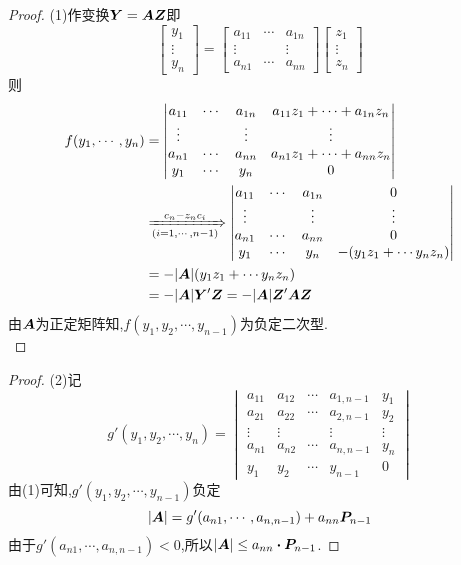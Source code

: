 \documentclass[lang=cn,11pt,normal]{elegantbook}
\begin{document}
		\begin{proof}
		(1)作变换$\YY=\AA\ZZ$即
		\begin{equation}
		\begin{bmatrix}
		y_1\\\vdots\\y_n
		\end{bmatrix}
		=
		\begin{bmatrix}
		a_{11}&\cdots&a_{1n}\\
		\vdots&      &\vdots\\
		a_{n1}&\cdots&a_{nn}
		\end{bmatrix}
		\begin{bmatrix}
		z_1\\\vdots\\z_n
		\end{bmatrix}
		\end{equation}
		则
		\begin{equation}
		\begin{aligned}
		f(y_1,\cdots,y_n)&=
		\begin{vmatrix}
		a_{11}&\cdots&a_{1n}&a_{11}z_1+\cdots+a_{1n}z_n\\
		\vdots&&\vdots&\vdots\\
		a_{n1}&\cdots&a_{nn}&a_{n1}z_1+\cdots+a_{nn}z_n\\
		y_1&\cdots&y_n&0
		\end{vmatrix}\\
		&\xRightarrow[(i=1,\cdots,n-1)]{c_n-z_nc_i}
		\begin{vmatrix}
		a_{11}&\cdots&a_{1n}&0\\
		\vdots&&\vdots&\vdots\\
		a_{n1}&\cdots&a_{nn}&0\\
		y_1&\cdots&y_n&-(y_1z_1+\cdots y_nz_n)
		\end{vmatrix}\\
		&=-|\AA|(y_1z_1+\cdots y_nz_n)\\
		&=-|\AA|\YY'\ZZ=-|\AA|\ZZ'\AA\ZZ
		\end{aligned}
		\end{equation}
		由$\AA$为正定矩阵知,$f(y_1,y_2,\cdots,y_{n-1})$为负定二次型.\\
	\end{proof}
	\begin{proof}
		(2)记
		\begin{equation}
		g'(y_1,y_2,\cdots,y_n)=
		\begin{vmatrix}
		a_{11}&a_{12}&\cdots&a_{1,n-1}&y_1\\
		a_{21}&a_{22}&\cdots&a_{2,n-1}&y_2\\
		\vdots&\vdots&&\vdots&\vdots\\
		a_{n1}&a_{n2}&\cdots&a_{n,n-1}&y_n\\
		y_1&y_2&\cdots&y_{n-1}&0
		\end{vmatrix}
		\end{equation}
		由(1)可知,$g'(y_1,y_2,\cdots,y_{n-1})$负定
		\begin{equation}
		|\AA|=g'(a_{n1},\cdots,a_{n,n-1})+a_{nn}\PP_{n-1}
		\end{equation}
		由于$g'(a_{n1},\cdots,a_{n,n-1})<0$,所以$|\AA|\leq a_{nn}\boldsymbol{\cdot}\PP_{n-1}$.
	\end{proof}
\end{document}
